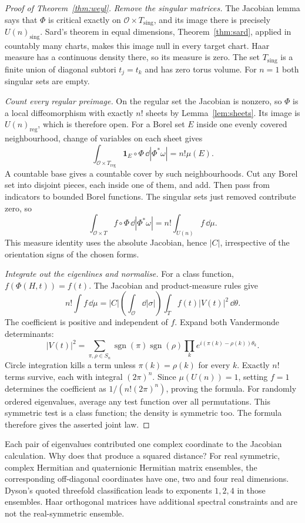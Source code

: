 \begin{proof}[Proof of Theorem~\ref{thm:weyl}]
\emph{Remove the singular matrices.}
The Jacobian lemma says that $\Phi$ is critical exactly on
$\mathcal O\times T_{\mathrm{sing}}$, and its image there is precisely
$U(n)_{\mathrm{sing}}$.
Sard's theorem in equal dimensions, Theorem~\ref{thm:sard}, applied in
countably many charts, makes this image null in every target chart.
Haar measure has a continuous density there, so its measure is zero.
The set $T_{\mathrm{sing}}$ is a finite union of diagonal subtori
$t_j=t_k$ and has zero torus volume. For $n=1$ both singular sets are empty.

\emph{Count every regular preimage.}
On the regular set the Jacobian is nonzero, so $\Phi$ is a local
diffeomorphism with exactly $n!$ sheets by Lemma~\ref{lem:sheets}.
Its image is $U(n)_{\mathrm{reg}}$, which is therefore open.
For a Borel set $E$ inside one evenly covered neighbourhood, change of
variables on each sheet gives
\[
 \int_{\mathcal O\times T_{\mathrm{reg}}}
       \mathbf1_E\circ\Phi\,\dd|\Phi^*\omega|=n!\mu(E).
\]
A countable base gives a countable cover by such neighbourhoods.
Cut any Borel set into disjoint pieces, each inside one of them, and add.
Then pass from indicators to bounded Borel functions.
The singular sets just removed contribute zero, so
\[
 \int_{\mathcal O\times T}f\circ\Phi\,\dd|\Phi^*\omega|
 =n!\int_{U(n)}f\,\dd\mu.
\]
This measure identity uses the absolute Jacobian, hence $|C|$, irrespective
of the orientation signs of the chosen forms.

\emph{Integrate out the eigenlines and normalise.}
For a class function, $f(\Phi(H,t))=f(t)$.
The Jacobian and product-measure rules give
\[
 n!\int f\,\dd\mu
 =|C|\left(\int_{\mathcal O}\dd|\sigma|\right)
       \int_Tf(t)|V(t)|^2\,\dd\theta.
\]
The coefficient is positive and independent of $f$.
Expand both Vandermonde determinants:
\[
 |V(t)|^2=\sum_{\pi,\rho\in S_n}
 \operatorname{sgn}(\pi)\operatorname{sgn}(\rho)
 \prod_ke^{i(\pi(k)-\rho(k))\theta_k}.
\]
Circle integration kills a term unless $\pi(k)=\rho(k)$ for every $k$.
Exactly $n!$ terms survive, each with integral $(2\pi)^n$.
Since $\mu(U(n))=1$, setting $f=1$ determines the coefficient as
$1/(n!(2\pi)^n)$, proving the formula.
For randomly ordered eigenvalues, average any test function over all
permutations. This symmetric test is a class function; the density is
symmetric too. The formula therefore gives the asserted joint law.
\end{proof}

\begin{think}
Each pair of eigenvalues contributed one complex coordinate to the
Jacobian calculation. Why does that produce a squared distance?
For real symmetric, complex Hermitian and quaternionic Hermitian matrix
ensembles, the corresponding off-diagonal coordinates have one, two and
four real dimensions. Dyson's quoted threefold classification leads to
exponents $1,2,4$ in those ensembles. Haar orthogonal matrices have additional
spectral constraints and are not the real-symmetric ensemble.
\end{think}

